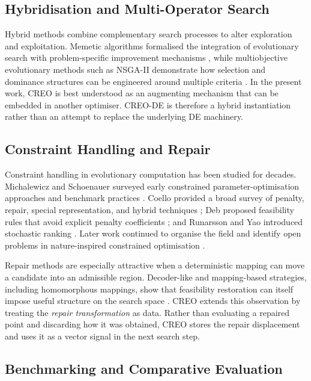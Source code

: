 \documentclass[journal]{IEEEtran}
\begin{document}
\subsection{Hybridisation and Multi-Operator Search}

Hybrid methods combine complementary search processes to alter exploration and exploitation. Memetic algorithms formalised the integration of evolutionary search with problem-specific improvement mechanisms \cite{moscato1989memetic}, while multiobjective evolutionary methods such as NSGA-II demonstrate how selection and dominance structures can be engineered around multiple criteria \cite{deb2002nsga2}. In the present work, CREO is best understood as an augmenting mechanism that can be embedded in another optimiser. CREO-DE is therefore a hybrid instantiation rather than an attempt to replace the underlying DE machinery.

\subsection{Constraint Handling and Repair}

Constraint handling in evolutionary computation has been studied for decades. Michalewicz and Schoenauer surveyed early constrained parameter-optimisation approaches and benchmark practices \cite{michalewicz1996constrained}. Coello provided a broad survey of penalty, repair, special representation, and hybrid techniques \cite{coello2002theoretical}; Deb proposed feasibility rules that avoid explicit penalty coefficients \cite{deb2000efficient}; and Runarsson and Yao introduced stochastic ranking \cite{runarsson2000stochastic}. Later work continued to organise the field and identify open problems in nature-inspired constrained optimisation \cite{mezura2011constraint}.

Repair methods are especially attractive when a deterministic mapping can move a candidate into an admissible region. Decoder-like and mapping-based strategies, including homomorphous mappings, show that feasibility restoration can itself impose useful structure on the search space \cite{koziel1999homomorphous}. CREO extends this observation by treating the \emph{repair transformation} as data. Rather than evaluating a repaired point and discarding how it was obtained, CREO stores the repair displacement and uses it as a vector signal in the next search step.

\subsection{Benchmarking and Comparative Evaluation}
\end{document}

